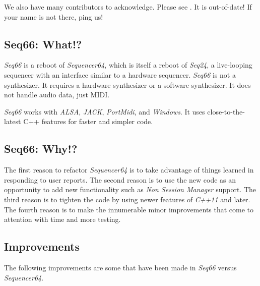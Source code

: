 \documentclass[
 11pt,
 twoside,
 a4paper,
 final                                 %
]{article}
\begin{document}
   We also have many contributors to acknowledge.
   Please see .
   It is out-of-date!  If your name is not there, ping us!

\subsection{Seq66: What!?}
\label{subsec:what_is_seq66}

   \textsl{Seq66} is a reboot of \textsl{Sequencer64}, which
   is itself a reboot of \textsl{Seq24},
   a live-looping sequencer with an interface similar to a hardware sequencer.
   \textsl{Seq66} is not a synthesizer.  It requires a hardware
   synthesizer or a software synthesizer.  It does not handle audio data,
   just MIDI.

   \textsl{Seq66} works with \textsl{ALSA}, \textsl{JACK},
   \textsl{PortMidi}, and \textsl{Windows}. It uses close-to-the-latest C++
   features for faster and simpler code.

\subsection{Seq66: Why!?}
\label{subsec:introduction_vs_others}

   The first reason to refactor \textsl{Sequencer64} is to take advantage of
   things learned in responding to user reports.  The second reason is to use
   the new code as an opportunity to add new functionality such as
   \textsl{Non Session Manager} support.  The third reason is to tighten the
   code by using newer features of \textsl{C++11} and later.
   The fourth reason is to make the innumerable minor improvements that come to
   attention with time and more testing.

\subsection{Improvements}
\label{subsec:improvements}

   The following improvements are some that have been made in
   \textsl{Seq66} versus \textsl{Sequencer64}.
\end{document}
